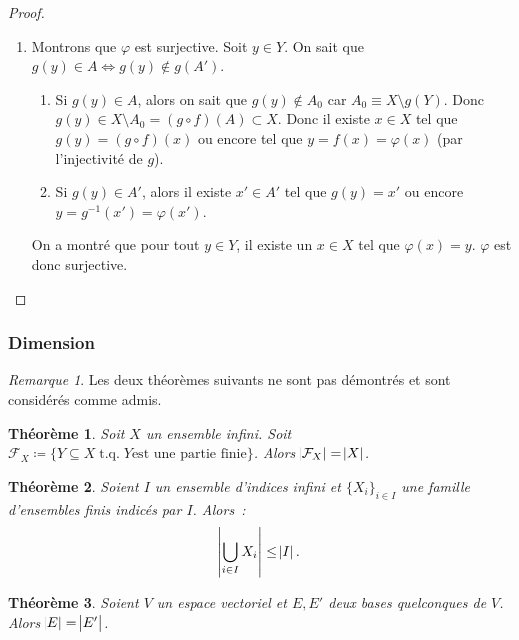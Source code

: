 \documentclass{article}
\DeclareMathOperator{\tq}{\text{ t.q. }}
\newtheorem{thm}{Théorème}[section]
\theoremstyle{definition}
\theoremstyle{remark}
\newtheorem*{rmq}{Remarque}
\begin{document}
\begin{proof}
\begin{enumerate}
			\item Montrons que $\varphi$ est surjective. Soit $y \in Y$. On sait que $g(y) \in A \iff g(y) \not \in g(A')$.
			\begin{enumerate}
				\item Si $g(y) \in A$, alors on sait que $g(y) \not \in A_0$ car $A_0 \equiv X \setminus g(Y)$. Donc $g(y) \in X \setminus A_0 = (g \circ f)(A) \subset X$.
				Donc il existe $x \in X$ tel que $g(y) = (g \circ f)(x)$ ou encore tel que $y = f(x) = \varphi(x)$ (par l'injectivité de $g$).
				\item Si $g(y) \in A'$, alors il existe $x' \in A'$ tel que $g(y) = x'$ ou encore $y = g^{-1}(x') = \varphi(x')$.
			\end{enumerate}
			On a montré que pour tout $y \in Y$, il existe un $x \in X$ tel que $\varphi(x) = y$. $\varphi$ est donc surjective.
		\end{enumerate}
		\end{proof}
	
		\subsubsection{Dimension}
		\begin{rmq} Les deux théorèmes suivants ne sont pas démontrés et sont considérés comme admis. \end{rmq}
		
		\begin{thm}\label{cardPartiesFinies} Soit $X$ un ensemble infini. Soit $\mathcal F_X \coloneqq \{Y \subseteq X \tq Y \text {est une partie finie}\}$.
		Alors $\abs {\mathcal F_X} = \abs X$. \end{thm}

		\begin{thm}\label{unionEnsFinisIndicésInfini} Soient $I$ un ensemble d'indices infini et $\{X_i\}_{i \in I}$ une famille d'ensembles finis indicés par $I$.
		Alors~: \[\abs {\bigcup_{i \in I}X_i} \leq \abs I.\] \end{thm}
		
		\begin{thm} Soient $V$ un espace vectoriel et $E, E'$ deux bases quelconques de $V$. Alors $\abs E = \abs {E'}$. \end{thm}
\end{document}
